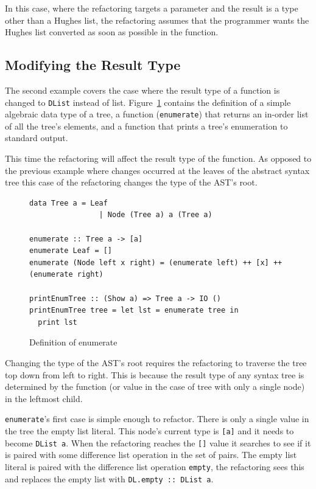 In this case, where the refactoring targets a parameter and the result is a type other than a Hughes list, the refactoring assumes that the programmer wants the Hughes list converted as soon as possible in the function. 

\subsection{Modifying the Result Type}
\label{hugesListResTy}

The second example covers the case where the result type of a function is changed to \texttt{DList} instead of list. Figure~\ref{enumBefore} contains the definition of a simple algebraic data type of a tree, a function (\texttt{enumerate}) that returns an in-order list of all the tree's elements, and a function that prints a tree's enumeration to standard output. 

This time the refactoring will affect the result type of the function. As opposed to the previous example where changes occurred at the leaves of the abstract syntax tree this case of the refactoring changes the type of the AST's root. 

\begin{figure}[t]
\begin{lstlisting}
data Tree a = Leaf
                | Node (Tree a) a (Tree a)

enumerate :: Tree a -> [a]
enumerate Leaf = []
enumerate (Node left x right) = (enumerate left) ++ [x] ++ (enumerate right)

printEnumTree :: (Show a) => Tree a -> IO ()
printEnumTree tree = let lst = enumerate tree in
  print lst
\end{lstlisting}
\caption{Definition of enumerate}
\label{enumBefore}
\end{figure} 

Changing the type of the AST's root requires the refactoring to traverse the tree top down from left to right. This is because the result type of any syntax tree is determined by the function (or value in the case of tree with only a single node) in the leftmost child. 

\texttt{enumerate}'s first case is simple enough to refactor. There is only a single value in the tree the empty list literal. This node's current type is \texttt{[a]} and it needs to become \texttt{DList a}. When the refactoring reaches the \texttt{[]} value it searches to see if it is paired with some difference list operation in the set of pairs. The empty list literal is paired with the difference list operation \texttt{empty}, the refactoring sees this and replaces the empty list with \texttt{DL.empty :: DList a}.

